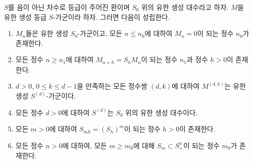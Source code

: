 \begin{lemma}[2.1.6]
\label{II.2.1.6-ko}
$S$를 음이 아닌 차수로 등급이 주어진 환이며 $S_0$ 위의 유한 생성
대수라고 하자. $M$을 유한 생성 등급 $S$-가군이라 하자. 그러면 다음이
성립한다.
\begin{enumerate}
  \item[\rm(i)] $M_n$들은 유한 생성 $S_0$-가군이고, 모든
    $n\leq n_0$에 대하여 $M_n=0$이 되는 정수 $n_0$가 존재한다.
  \item[\rm(ii)] 모든 정수 $n\geq n_1$에 대하여
    $M_{n+h}=S_hM_n$이 되는 정수 $n_1$과 정수 $h>0$이 존재한다.
  \item[\rm(iii)] $d>0$, $0\leq k\leq d-1$을 만족하는 모든 정수쌍
    $(d,k)$에 대하여 $M^{(d,k)}$는 유한 생성 $S^{(d)}$-가군이다.
  \item[\rm(iv)] 모든 정수 $d>0$에 대하여 $S^{(d)}$는 $S_0$ 위의
    유한 생성 대수이다.
  \item[\rm(v)] 모든 $m>0$에 대하여 $S_{mh}=(S_h)^m$이 되는 정수
    $h>0$이 존재한다.
  \item[\rm(vi)] 모든 정수 $n>0$에 대하여, 모든 $m\geq m_0$에 대해
    $S_m\subset S_+^n$이 되는 정수 $m_0$가 존재한다.
\end{enumerate}
\end{lemma}

